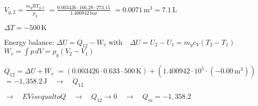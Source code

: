 \( V_{g,2} = \frac{m_g R T_{g,2}}{p_g} \)  
\( = \frac{0.003426 \cdot 166.28 \cdot 273.15}{1.400942 \, \text{bar}} \)  
\( = 0.0071 \, \text{m}^3 = 7.1 \, \text{L} \)  

\( \Delta T = -500 \, \text{K} \)  

Energy balance:  
\( \Delta U = Q_{12} - W_v \)  
\( \text{with} \quad \Delta U = U_2 - U_1 = m_g c_V (T_2 - T_1) \)  
\( W_v = \int p \, dV = p_g (V_2 - V_1) \)  

\( Q_{12} = \Delta U + W_v \)  
\( = (0.003426 \cdot 0.633 \cdot 500 \, \text{K}) + (1.400942 \cdot 10^5 \cdot (-0.00 \, \text{m}^3)) \)  
\( = -1,358.2 \, \text{J} \quad \rightarrow \quad Q_{12} \)  

\( \rightarrow \quad EV is equal to Q \quad \rightarrow \quad Q_{12} \rightarrow 0 \quad \rightarrow \quad Q_m = -1,358.2 \)